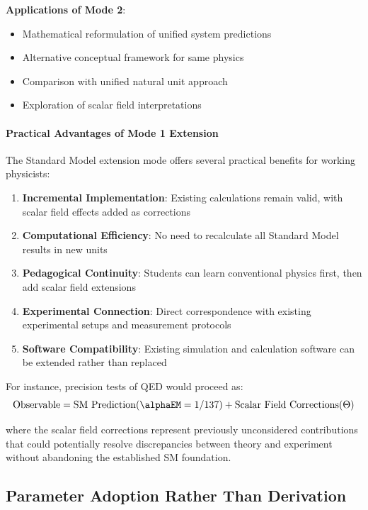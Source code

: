 	\textbf{Applications of Mode 2}:
	\begin{itemize}
		\item Mathematical reformulation of unified system predictions
		\item Alternative conceptual framework for same physics
		\item Comparison with unified natural unit approach
		\item Exploration of scalar field interpretations
	\end{itemize}
	
	\paragraph{Practical Advantages of Mode 1 Extension}
	\label{par:practical_advantages_mode1}
	
	The Standard Model extension mode offers several practical benefits for working physicists:
	
	\begin{enumerate}
		\item \textbf{Incremental Implementation}: Existing calculations remain valid, with scalar field effects added as corrections
		\item \textbf{Computational Efficiency}: No need to recalculate all Standard Model results in new units
		\item \textbf{Pedagogical Continuity}: Students can learn conventional physics first, then add scalar field extensions
		\item \textbf{Experimental Connection}: Direct correspondence with existing experimental setups and measurement protocols
		\item \textbf{Software Compatibility}: Existing simulation and calculation software can be extended rather than replaced
	\end{enumerate}
	
	For instance, precision tests of QED would proceed as:
	\begin{equation}
		\text{Observable} = \text{SM Prediction}(\alphaEM = 1/137) + \text{Scalar Field Corrections}(\Theta)
	\end{equation}
	
	where the scalar field corrections represent previously unconsidered contributions that could potentially resolve discrepancies between theory and experiment without abandoning the established SM foundation.
	
	\subsection{Parameter Adoption Rather Than Derivation}
	\label{subsec:parameter_adoption}
	
